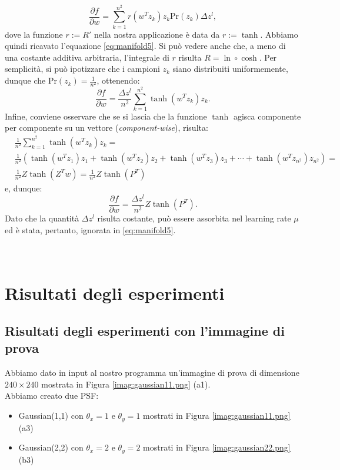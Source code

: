 \documentclass[final]{siamltex}
\begin{document}
{%
\begin{equation}
\frac{\partial f }{\partial w} = \sum_{k=1}^{n^2} r(w^T z_k)z_k \mathrm{Pr}(z_k) \Delta z^{l},
\end{equation}
%
dove la funzione $r:=R'$ nella nostra applicazione \`{e} data da $r:=\tanh$. Abbiamo quindi ricavato l'equazione \eqref{eq:manifold5}.
Si pu\`{o} vedere anche che, a meno di una costante additiva arbitraria, l'integrale di $r$ risulta $R = \ln \circ \cosh$. 
Per semplicit\`{a}, si pu\`{o} ipotizzare che i campioni $z_k$ siano distribuiti uniformemente, dunque che $\mathrm{Pr}(z_k)=\frac{1}{n^2}$, ottenendo:
%
\begin{equation}
\frac{\partial f }{\partial w} = \frac{\Delta z^{l}}{n^2}\sum_{k=1}^{n^2} \tanh(w^T z_k)z_k.
\end{equation}
%
Infine, conviene osservare che se si lascia che la funzione $\tanh$ agisca componente per componente su un vettore (\emph{component-wise}), risulta:
%
\begin{eqnarray*}
&\frac{1}{n^2}\sum_{k=1}^{n^2}\tanh(w^T z_k)z_k=\\
&\frac{1}{n^2}\left(\tanh(w^T z_1)z_1+\tanh(w^T z_2)z_2+\tanh(w^T z_3)z_3+\cdots+\tanh(w^T z_{n^2})z_{n^2}\right)=\\
&\frac{1}{n^2}Z\tanh(Z^Tw)=\frac{1}{n^2}Z\tanh(P^T)
\end{eqnarray*}
%
e, dunque:
%
\begin{equation}
\frac{\partial f }{\partial w} = \frac{\Delta z^{l}}{n^2}Z\tanh(P^T).
\end{equation}
%
Dato che la quantit\`{a} $\Delta z^{l}$ risulta costante, pu\`{o} essere assorbita nel learning rate $\mu$ ed \`{e} stata, pertanto, ignorata in \eqref{eq:manifold5}.
\\
\\
\\
\section{Risultati degli esperimenti}\label{sec3}
%
\subsection{Risultati degli esperimenti con l'immagine di prova} \label{sec10}
Abbiamo dato in input al nostro programma un'immagine di prova di dimensione $240 \times 240$ mostrata in Figura \ref{imag:gaussian11.png} (a1). \\
Abbiamo creato due PSF:
\begin{itemize}
    \item Gaussian(1,1) con $\theta_x = 1$ e $\theta_y = 1$ mostrati in Figura \ref{imag:gaussian11.png} (a3)
    \item Gaussian(2,2) con $\theta_x = 2$ e $\theta_y = 2$ mostrati in Figura \ref{imag:gaussian22.png} (b3) \\
\end{itemize}
%
%

}
\end{document}
